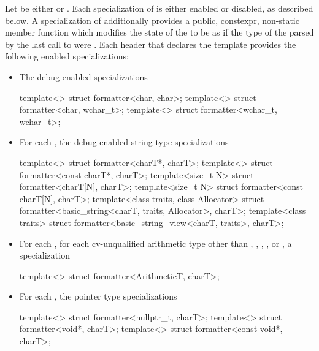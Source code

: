 \pnum
Let  be either  or .
Each specialization of  is either enabled or disabled,
as described below.
%
A  specialization of 
additionally provides
a public, constexpr, non-static member function 
which modifies the state of the  to be as if
the type of the 
parsed by the last call to  were .
Each header that declares the template 
provides the following enabled specializations:
\begin{itemize}
\item
{}%
The debug-enabled specializations
\begin{codeblock}
template<> struct formatter<char, char>;
template<> struct formatter<char, wchar_t>;
template<> struct formatter<wchar_t, wchar_t>;
\end{codeblock}

\item
{}%
For each ,
the debug-enabled string type specializations
\begin{codeblock}
template<> struct formatter<charT*, charT>;
template<> struct formatter<const charT*, charT>;
template<size_t N> struct formatter<charT[N], charT>;
template<size_t N> struct formatter<const charT[N], charT>;
template<class traits, class Allocator>
  struct formatter<basic_string<charT, traits, Allocator>, charT>;
template<class traits>
  struct formatter<basic_string_view<charT, traits>, charT>;
\end{codeblock}

\item
{}%
For each ,
for each cv-unqualified arithmetic type 
other than
,
,
,
, or
,
a specialization
\begin{codeblock}
template<> struct formatter<ArithmeticT, charT>;
\end{codeblock}

\item
{}%
%
For each ,
the pointer type specializations
\begin{codeblock}
template<> struct formatter<nullptr_t, charT>;
template<> struct formatter<void*, charT>;
template<> struct formatter<const void*, charT>;
\end{codeblock}
\end{itemize}
